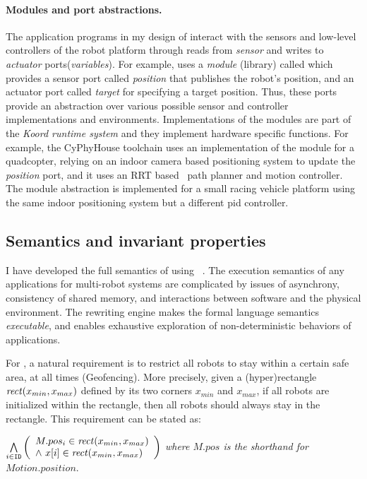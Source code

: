 \paragraph{Modules and port abstractions.}
The application programs in my design of \lgname interact with the sensors and low-level controllers of the robot platform through reads from \emph{sensor} and writes to \emph{actuator} ports(\emph{variables}).
%
%
%
For example, \LineForm uses a \emph{module} (library) called \Motion which provides a sensor port called \emph{position} that publishes the robot's position, and an actuator port called \emph{target} for specifying a target position.
%
Thus, these  ports provide an abstraction over various possible sensor and controller implementations and environments.
%
Implementations of the modules are part of the {\em Koord runtime system\/} and they implement hardware specific functions.
For example, the CyPhyHouse toolchain uses an  implementation of the \Motion module for a quadcopter, relying on an indoor camera based positioning system to update the \emph{position} port,
and it uses an RRT based~\cite{lavalle1998rapidly} path planner and motion controller.
%
The \Motion module abstraction is implemented for a small racing vehicle platform using the same indoor positioning system but a different pid controller. 

\subsection{Semantics and invariant properties}

I have developed the full semantics of \lgname using \K~\cite{rosu-serbanuta-2013-k}. The execution semantics of any applications for multi-robot systems are complicated by issues of asynchrony, consistency of shared memory, and interactions between software and the physical environment. The \K rewriting engine makes the formal language semantics \emph{executable}, and enables exhaustive exploration of non-deterministic behaviors of \lgname applications.

For \LineForm, a natural requirement is to restrict all robots to stay within a certain safe area, at all times (Geofencing).
More precisely, given a (hyper)rectangle $\mathit{rect}(x_{min}, x_{max})$ defined by its two corners $x_{min}$ and $x_{max}$,
if all robots are initialized within the rectangle, then all robots should always stay in the rectangle.
This requirement can be stated as:
\begin{invariant}
\label{inv:lineform}
\(
\bigwedge\limits_{i \in \texttt{ID}}
    \left(
    \begin{array}{l}
        M.pos_{i} \in \mathit{rect}(x_{min}, x_{max}) \\
        \land\ x[i] \in \mathit{rect}(x_{min}, x_{max})
    \end{array}
    \right)
\)
\emph{where $M.pos$ is the shorthand for $Motion.position$}.
\end{invariant}
\noindent


